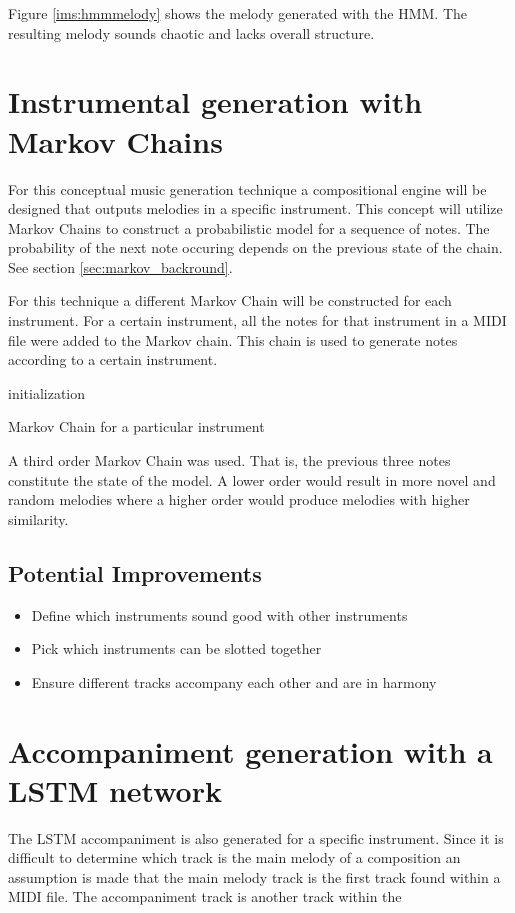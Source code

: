 Figure \ref{ims:hmmmelody} shows the melody generated with the \ac{HMM}. The resulting melody sounds chaotic and lacks overall structure.


\chapter{Instrumental generation with Markov Chains}
For this conceptual music generation technique a compositional engine will be designed that outputs melodies in a specific instrument. This concept will utilize Markov Chains to construct a probabilistic model for a sequence of notes. The probability of the next note occuring depends on the previous state of the chain. See section \ref{sec:markov_backround}.

For this technique a different Markov Chain will be constructed for each instrument.
For a certain instrument, all the notes for that instrument in a MIDI file were added to the Markov chain. This chain is used to generate notes according to a certain instrument.
\begin{algorithm}
 initialization\;
 \caption{Markov Chain for a particular instrument}
\end{algorithm}

A third order Markov Chain was used. That is, the previous three notes constitute the state of the model. A lower order would result in more novel and random melodies where a higher order would produce melodies with higher similarity.

\section{Potential Improvements}
\begin{itemize}
\item Define which instruments sound good with other instruments
\item Pick which instruments can be slotted together
\item Ensure different tracks accompany each other and are in harmony
\end{itemize}



\chapter{Accompaniment generation with a LSTM network}
The LSTM accompaniment is also generated for a specific instrument. 
Since it is difficult to determine which track is the main melody of a composition an assumption is made that the main melody track is the first track found within a MIDI file. The accompaniment track is another track within the 

